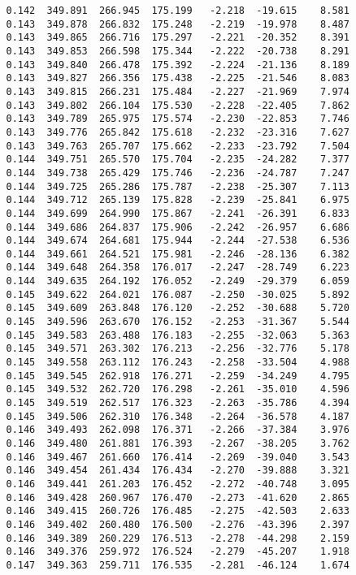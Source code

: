 \begin{verbatim}
   0.142  349.891  266.945  175.199   -2.218  -19.615    8.581
   0.143  349.878  266.832  175.248   -2.219  -19.978    8.487
   0.143  349.865  266.716  175.297   -2.221  -20.352    8.391
   0.143  349.853  266.598  175.344   -2.222  -20.738    8.291
   0.143  349.840  266.478  175.392   -2.224  -21.136    8.189
   0.143  349.827  266.356  175.438   -2.225  -21.546    8.083
   0.143  349.815  266.231  175.484   -2.227  -21.969    7.974
   0.143  349.802  266.104  175.530   -2.228  -22.405    7.862
   0.143  349.789  265.975  175.574   -2.230  -22.853    7.746
   0.143  349.776  265.842  175.618   -2.232  -23.316    7.627
   0.143  349.763  265.707  175.662   -2.233  -23.792    7.504
   0.144  349.751  265.570  175.704   -2.235  -24.282    7.377
   0.144  349.738  265.429  175.746   -2.236  -24.787    7.247
   0.144  349.725  265.286  175.787   -2.238  -25.307    7.113
   0.144  349.712  265.139  175.828   -2.239  -25.841    6.975
   0.144  349.699  264.990  175.867   -2.241  -26.391    6.833
   0.144  349.686  264.837  175.906   -2.242  -26.957    6.686
   0.144  349.674  264.681  175.944   -2.244  -27.538    6.536
   0.144  349.661  264.521  175.981   -2.246  -28.136    6.382
   0.144  349.648  264.358  176.017   -2.247  -28.749    6.223
   0.144  349.635  264.192  176.052   -2.249  -29.379    6.059
   0.145  349.622  264.021  176.087   -2.250  -30.025    5.892
   0.145  349.609  263.848  176.120   -2.252  -30.688    5.720
   0.145  349.596  263.670  176.152   -2.253  -31.367    5.544
   0.145  349.583  263.488  176.183   -2.255  -32.063    5.363
   0.145  349.571  263.302  176.213   -2.256  -32.776    5.178
   0.145  349.558  263.112  176.243   -2.258  -33.504    4.988
   0.145  349.545  262.918  176.271   -2.259  -34.249    4.795
   0.145  349.532  262.720  176.298   -2.261  -35.010    4.596
   0.145  349.519  262.517  176.323   -2.263  -35.786    4.394
   0.145  349.506  262.310  176.348   -2.264  -36.578    4.187
   0.146  349.493  262.098  176.371   -2.266  -37.384    3.976
   0.146  349.480  261.881  176.393   -2.267  -38.205    3.762
   0.146  349.467  261.660  176.414   -2.269  -39.040    3.543
   0.146  349.454  261.434  176.434   -2.270  -39.888    3.321
   0.146  349.441  261.203  176.452   -2.272  -40.748    3.095
   0.146  349.428  260.967  176.470   -2.273  -41.620    2.865
   0.146  349.415  260.726  176.485   -2.275  -42.503    2.633
   0.146  349.402  260.480  176.500   -2.276  -43.396    2.397
   0.146  349.389  260.229  176.513   -2.278  -44.298    2.159
   0.146  349.376  259.972  176.524   -2.279  -45.207    1.918
   0.147  349.363  259.711  176.535   -2.281  -46.124    1.674

\end{verbatim}
